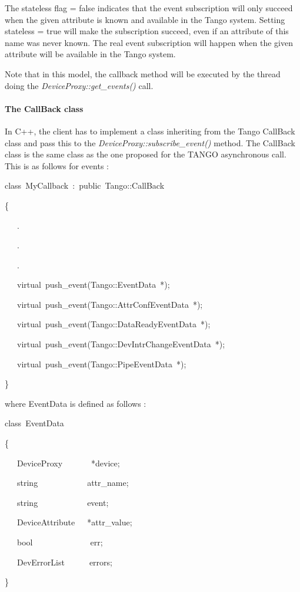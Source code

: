 The stateless flag = false indicates that the event subscription will
only succeed when the given attribute is known and available in the
Tango system. Setting stateless = true will make the subscription
succeed, even if an attribute of this name was never known. The real
event subscription will happen when the given attribute will be available
in the Tango system.

Note that in this model, the callback method will be executed by the
thread doing the \emph{DeviceProxy::get\_events()} call.


\paragraph{The CallBack class}

In C++, the client has to implement a class inheriting from the Tango
CallBack class and pass this to the \emph{DeviceProxy::subscribe\_event()}
method. The CallBack class is the same class as the one proposed for
the TANGO asynchronous call. This is as follows for events :
\begin{lyxcode}
class~MyCallback~:~public~Tango::CallBack

\{

~~~.

~~~.

~~~.

~~~virtual~push\_event(Tango::EventData~{*});

~~~virtual~push\_event(Tango::AttrConfEventData~{*});

~~~virtual~push\_event(Tango::DataReadyEventData~{*});

~~~virtual~push\_event(Tango::DevIntrChangeEventData~{*});

~~~virtual~push\_event(Tango::PipeEventData~{*});

\}
\end{lyxcode}
where EventData is defined as follows :
\begin{lyxcode}
class~EventData~

\{

~~~DeviceProxy~~~~~~~{*}device;

~~~string~~~~~~~~~~~~attr\_name;

~~~string~~~~~~~~~~~~event;

~~~DeviceAttribute~~~{*}attr\_value;

~~~bool~~~~~~~~~~~~~~err;

~~~DevErrorList~~~~~~errors;

\}
\end{lyxcode}
